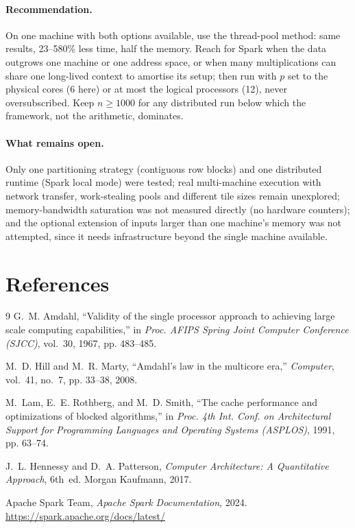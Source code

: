 \documentclass[11pt,a4paper]{article}
\makeatletter
\newcommand{\swallownextsectionstar}{%
  \let\originalsection\section
  \renewcommand{\section}{\@ifnextchar*{\swallowsectionstar}{\originalsection}}}
\def\swallowsectionstar*#1{\let\section\originalsection}
\makeatother
\begin{document}
\paragraph{Recommendation.}
On one machine with both options available, use the thread-pool method:
same results, 23--580\% less time, half the memory. Reach for Spark when
the data outgrows one machine or one address space, or when many
multiplications can share one long-lived context to amortise its setup;
then run with $p$ set to the physical cores (6 here) or at most the
logical processors (12), never oversubscribed. Keep $n \ge 1000$ for any
distributed run below which the framework, not the arithmetic, dominates.

\paragraph{What remains open.} Only one partitioning strategy (contiguous
row blocks) and one distributed runtime (Spark local mode) were tested;
real multi-machine execution with network transfer, work-stealing pools and
different tile sizes remain unexplored; memory-bandwidth saturation was not
measured directly (no hardware counters); and the optional extension of
inputs larger than one machine's memory was not attempted, since it needs
infrastructure beyond the single machine available.


\section{References}
\swallownextsectionstar

\begin{thebibliography}{9}
    G.~M. Amdahl, ``Validity of the single processor approach to achieving
    large scale computing capabilities,'' in \emph{Proc. AFIPS Spring Joint
    Computer Conference (SJCC)}, vol.~30, 1967, pp. 483--485.

    M.~D. Hill and M.~R. Marty, ``Amdahl's law in the multicore era,''
    \emph{Computer}, vol.~41, no.~7, pp. 33--38, 2008.

    M.~Lam, E.~E. Rothberg, and M.~D. Smith, ``The cache performance and
    optimizations of blocked algorithms,'' in \emph{Proc. 4th Int. Conf. on
    Architectural Support for Programming Languages and Operating Systems
    (ASPLOS)}, 1991, pp. 63--74.

    J.~L. Hennessy and D.~A. Patterson, \emph{Computer Architecture: A
    Quantitative Approach}, 6th~ed. Morgan Kaufmann, 2017.

    Apache Spark Team, \emph{Apache Spark Documentation}, 2024.
    \url{https://spark.apache.org/docs/latest/}
\end{thebibliography}
\end{document}
